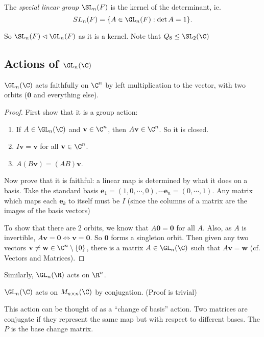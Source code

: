 \documentclass[a4paper]{article}
\begin{document}
\begin{defi}
  The \emph{special linear group} $\SL_n(F)$ is the kernel of the determinant, ie.
  \[
    SL_n(F) = \{A\in \GL_n(F): \det A = 1\}.
  \]
\end{defi}

So $\SL_n(F)\lhd \GL_n(F)$ as it is a kernel. Note that $Q_8\leq \SL_2(\C)$
\subsection{Actions of \texorpdfstring{$\GL_n(\C)$}{GLn(C)}}
\begin{prop}
  $\GL_n(\C)$ acts faithfully on $\C^n$ by left multiplication to the vector, with two orbits ($\mathbf{0}$ and everything else).
\end{prop}

\begin{proof}
  First show that it is a group action:
  \begin{enumerate}[label=\arabic{*}.]
      \setcounter{enumi}{0}
    \item If $A\in \GL_n(\C)$ and $\mathbf{v}\in \C^n$, then $A\mathbf{v}\in \C^n$. So it is closed.
    \item $I\mathbf{v} = \mathbf{v}$ for all $\mathbf{v}\in \C^n$.
    \item $A(B\mathbf{v}) = (AB)\mathbf{v}$.
  \end{enumerate}

  Now prove that it is faithful: a linear map is determined by what it does on a basis. Take the standard basis $\mathbf{e}_1 = (1, 0, \cdots, 0), \cdots \mathbf{e}_n = (0, \cdots, 1)$. Any matrix which maps each $\mathbf{e}_k$ to itself must be $I$ (since the columns of a matrix are the images of the basis vectors)

  To show that there are 2 orbits, we know that $A\mathbf{0} = \mathbf{0}$ for all $A$. Also, as $A$ is invertible, $A\mathbf{v} = \mathbf{0}\Leftrightarrow \mathbf{v} = \mathbf{0}$. So $\mathbf{0}$ forms a singleton orbit. Then given any two vectors $\mathbf{v}\not= \mathbf{w}\in \C^n\setminus\{0\}$, there is a matrix $A\in \GL_n(\C)$ such that $A\mathbf{v} = \mathbf{w}$ (cf. Vectors and Matrices).
\end{proof}

Similarly, $\GL_n(\R)$ acts on $\R^n$.

\begin{prop}
  $\GL_n(\C)$ acts on $M_{n\times n}(\C)$ by conjugation. (Proof is trivial)
\end{prop}
This action can be thought of as a ``change of basis'' action. Two matrices are conjugate if they represent the same map but with respect to different bases. The $P$ is the base change matrix.
\end{document}
